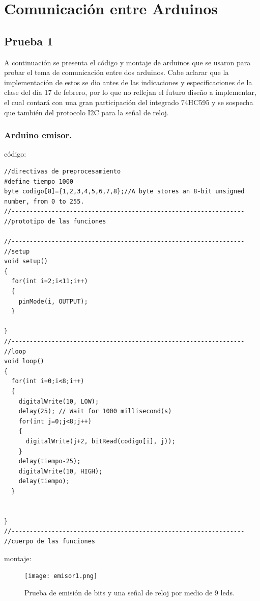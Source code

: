 \documentclass{article}
\begin{document}
\vspace{0.5cm}
\noindent


\section{Comunicación entre Arduinos} \label{Comunicación entre Arduinos}
\subsection{Prueba 1}\label{intento1}
A continuación se presenta el código y montaje de arduinos que se usaron para probar el tema de comunicación entre dos arduinos. Cabe aclarar que la implementación de estos se dio antes de las indicaciones y especificaciones de la clase del día 17 de febrero, por lo que no reflejan el futuro diseño a implementar, el cual contará con una gran participación del integrado 74HC595 y se sospecha que también del protocolo I2C para la señal de reloj.

\subsubsection{Arduino emisor.}\label{intento1}

código:
\begin{lstlisting}[style=myArduino]//directivas de preprocesamiento
#define tiempo 1000
byte codigo[8]={1,2,3,4,5,6,7,8};//A byte stores an 8-bit unsigned number, from 0 to 255.
//----------------------------------------------------------------
//prototipo de las funciones

//----------------------------------------------------------------
//setup
void setup()
{
  for(int i=2;i<11;i++)
  {
    pinMode(i, OUTPUT);
  }
  
}
//----------------------------------------------------------------
//loop
void loop()
{
  for(int i=0;i<8;i++)
  {
  	digitalWrite(10, LOW);
  	delay(25); // Wait for 1000 millisecond(s)
    for(int j=0;j<8;j++)
    {
      digitalWrite(j+2, bitRead(codigo[i], j));
    }
    delay(tiempo-25);
    digitalWrite(10, HIGH);
    delay(tiempo);
  }
  
  
}
//----------------------------------------------------------------
//cuerpo de las funciones
\end{lstlisting}

montaje:
\begin{figure}[h]
\texttt{[image: emisor1.png]}
\centering
\caption{Prueba de emisión de bits y una señal de reloj por medio de 9 leds.}
\label{fig:emisor1}
\end{figure}
\end{document}

